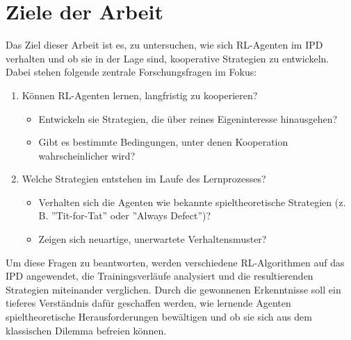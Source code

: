 \section{Ziele der Arbeit}
Das Ziel dieser Arbeit ist es, zu untersuchen, wie sich RL-Agenten im IPD verhalten
und ob sie in der Lage sind, kooperative Strategien zu entwickeln. Dabei stehen 
folgende zentrale Forschungsfragen im Fokus:
\begin{enumerate}
    \item Können RL-Agenten lernen, langfristig zu kooperieren?
        \begin{itemize}
            \item Entwickeln sie Strategien, die über reines Eigeninteresse hinausgehen?
            \item Gibt es bestimmte Bedingungen, unter denen Kooperation wahrscheinlicher wird?
        \end{itemize}
    \item Welche Strategien entstehen im Laufe des Lernprozesses?
        \begin{itemize}
            \item Verhalten sich die Agenten wie bekannte spieltheoretische Strategien (z. B. ''Tit-for-Tat'' oder ''Always Defect'')?
            \item Zeigen sich neuartige, unerwartete Verhaltensmuster?
        \end{itemize}
\end{enumerate}
Um diese Fragen zu beantworten, werden verschiedene RL-Algorithmen auf das IPD 
angewendet, die Trainingsverläufe analysiert und die resultierenden Strategien 
miteinander verglichen. Durch die gewonnenen Erkenntnisse soll ein tieferes Verständnis 
dafür geschaffen werden, wie lernende Agenten spieltheoretische Herausforderungen 
bewältigen und ob sie sich aus dem klassischen Dilemma befreien können.